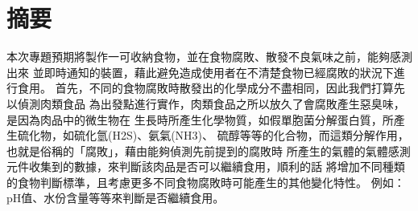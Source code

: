 \chapter*{摘要}

本次專題預期將製作一可收納食物，並在食物腐敗、散發不良氣味之前，能夠感測出來
並即時通知的裝置，藉此避免造成使用者在不清楚食物已經腐敗的狀況下進行食用。
首先，不同的食物腐敗時散發出的化學成分不盡相同，因此我們打算先以偵測肉類食品
為出發點進行實作，肉類食品之所以放久了會腐敗產生惡臭味，是因為肉品中的微生物在
生長時所產生化學物質，如假單胞菌分解蛋白質，所產生硫化物，如硫化氫(H2S)、氨氣(NH3)、
硫醇等等的化合物，而這類分解作用，也就是俗稱的「腐敗」，藉由能夠偵測先前提到的腐敗時
所產生的氣體的氣體感測元件收集到的數據，來判斷該肉品是否可以繼續食用，順利的話
將增加不同種類的食物判斷標準，且考慮更多不同食物腐敗時可能產生的其他變化特性。
例如：pH值、水份含量等等來判斷是否繼續食用。 